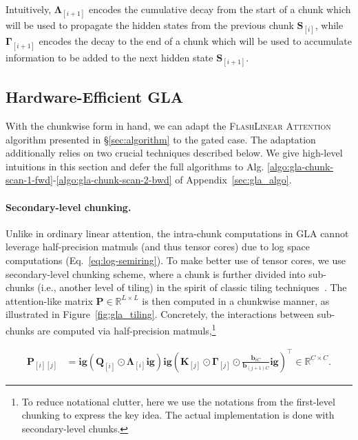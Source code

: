 Intuitively, $\mathbf \Lambda_{[i+1]} $ encodes the cumulative decay from the start of a chunk which will be used to propagate the hidden states from the previous chunk ${\mathbf{S}}_{[i]}$, while   $\mathbf \Gamma_{[i+1]}$ encodes the decay to the end of a chunk which will be used to accumulate information to be added to the next hidden state ${\mathbf{S}}_{[i+1]}$.

\subsection{Hardware-Efficient GLA}

\label{subsec:flash-gla}
With the chunkwise form in hand, we can adapt the \textsc{FlashLinear Attention} algorithm presented in \S\ref{sec:algorithm} to the gated case. The adaptation additionally relies on two crucial techniques described below. We give high-level intuitions in this section and defer the full algorithms to Alg. \ref{algo:gla-chunk-scan-1-fwd}-\ref{algo:gla-chunk-scan-2-bwd} of Appendix~\ref{sec:gla_algo}.

\paragraph{Secondary-level chunking.} Unlike in ordinary linear attention, the intra-chunk computations in GLA {cannot} leverage half-precision matmuls (and thus tensor cores) due to log space computations (Eq.~\ref{eq:log-semiring}). To make better use of tensor cores, we use secondary-level chunking scheme, where a chunk is further divided into sub-chunks (i.e., another level of tiling) in the spirit of classic tiling techniques~\cite{flashattention1}. The  attention-like matrix ${\mathbf{P}} \in \mathbb{R}^{L\times L}$ is then computed in a chunkwise manner, as illustrated in Figure~\ref{fig:gla_tiling}. 
 Concretely, the interactions  between sub-chunks are computed via half-precision matmuls,\footnote{To reduce notational clutter, here we use the notations from the first-level chunking to express the key idea. The actual implementation is done with secondary-level chunks.}

\begin{align*}
 {\mathbf{P}}_{[i][j]} &=  \mathbf{ig}({\mathbf{Q}}_{[i]} \odot {\mathbf{\Lambda}}_{[i]} \mathbf{ig}) \mathbf{ig}({\mathbf{K}}_{[j]} \odot {\mathbf{\Gamma}}_{[j]} \odot  
 \frac{{\bm{b}}_{iC}}{{\bm{b}}_{(j+1)C}} \mathbf{ig})^{\intercal} \in \mathbb{R}^{C\times C}.
 \label{eq:gla-subchunk-compute-p}
\end{align*}


